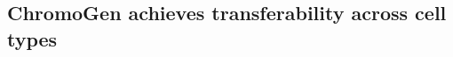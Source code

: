 \documentclass[12pt,letterpaper]{article}
\begin{document}
\begin{comment}
\begin{figure}[H]
    \centering
    \texttt{[image: ./biologically\_accurate\_mixed\_contribution13.pdf]}%
    \caption{
    \textbf{ChromoGen conformations match experimental measurements at both the population and single-cell level.
    }
    (a-c)
    The population Hi-C contact probability maps (left) are compared to population-median distance maps (center left) for both ChromoGen (lower triangle) and Dip-C (upper triangle) conformations in various genomic regions. 
    Also shown are the distance maps (center) and 3D conformations (center right) for one ChromoGen (lower triangle, purple) and one Dip-C (upper triangle, yellow) conformation selected from the same set of conformations used in the population-median distance maps. The right panel overlays the UMAP-embedded Dip-C structures over the probability distribution of conformations embedded by the same transformation. 
    (d) 
    Probability distribution of the Pearson correlation coefficient, $\rho$, between ChromoGen and Dip-C median distances (left), between median distances and log Hi-C contact probabilities (center), and between experimental Hi-C contact probabilities and those inferred from distances (right). ChromoGen and Dip-C results are shown in purple and orange, respectively, in the last two plots. 
    (e) The probability distribution of the RMSD between a given Dip-C structure from chromosome 22 and its best-aligned ChromoGen conformation generated in the same region is shown in orange. For comparison, the  distribution of RMSDs calculated using all pairs of Dip-C and ChromoGen conformations is shown in purple. 
    (f) Comparison between the Pearson correlation coefficients of insulation scores computed using population Hi-C and those derived from distances. 
    }
    \label{fig:guided_ensemble}
\end{figure}
\end{comment}





\subsection*{ChromoGen achieves transferability across cell types}
\label{sec:results:CTCF}
\end{document}
